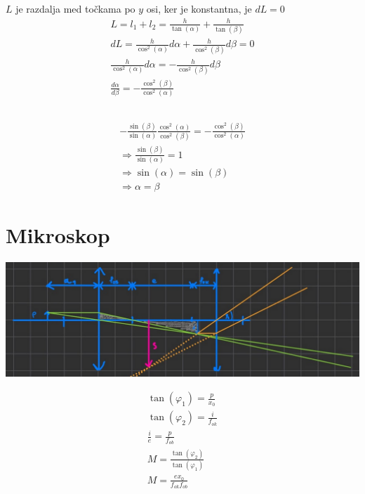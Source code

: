 \documentclass[a4paper,12pt]{article}
\begin{document}
\subsection{}
$L$ je razdalja med točkama po $y$ osi, ker je konstantna, je $dL = 0$
\begin{align}
    L = l_1 + l_2 = \frac{h}{\tan(\alpha)} + \frac{h}{\tan(\beta)}             \\
    dL = \frac{h}{\cos^2(\alpha)} d\alpha + \frac{h}{\cos^2(\beta)} d\beta = 0 \\
    \frac{h}{\cos^2(\alpha)} d\alpha = -\frac{h}{\cos^2(\beta)} d\beta         \\
    \frac{d \alpha}{d \beta} = -\frac{\cos^2(\beta)}{\cos^2(\alpha)}
\end{align}

\subsection{}
\begin{align}
    -\frac{\sin(\beta)}{\sin(\alpha)} \frac{\cos^2(\alpha)}{\cos^2(\beta)}= -\frac{\cos^2(\beta)}{\cos^2(\alpha)} \\
    \Rightarrow \frac{\sin(\beta)}{\sin(\alpha)} = 1                                                              \\
    \Rightarrow \sin(\alpha) = \sin(\beta)                                                                        \\
    \Rightarrow \alpha = \beta
\end{align}

\section{Mikroskop}\label{sec:mikroskop}
\includegraphics[width=\textwidth]{mikroskop.png}

\begin{align}
    \tan(\varphi_1) = \frac{p}{x_0} \\
    \tan(\varphi_2) = \frac{i}{f_{ok}} \\
    \frac{i}{e} = \frac{p}{f_{ob}} \\
    M = \frac{\tan(\varphi_2)}{\tan(\varphi_1)} \\
    M = \frac{e x_0}{f_{ok} f_{ob}} 
\end{align}
\end{document}
